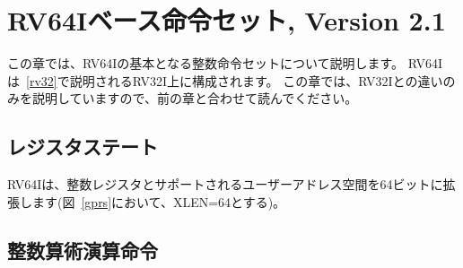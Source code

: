 \begin{comment}
\chapter{RV64I Base Integer Instruction Set, Version 2.1}
\end{comment}
\chapter{RV64Iベース命令セット, Version 2.1}
\label{rv64}

\begin{comment}
This chapter describes the RV64I base integer instruction set, which
builds upon the RV32I variant described in Chapter~\ref{rv32}.  This
chapter presents only the differences with RV32I, so should be read in
conjunction with the earlier chapter.
\end{comment}

この章では、RV64Iの基本となる整数命令セットについて説明します。
RV64Iは~\ref{rv32}で説明されるRV32I上に構成されます。
この章では、RV32Iとの違いのみを説明していますので、前の章と合わせて読んでください。

\begin{comment}
\section{Register State}
\end{comment}
\section{レジスタステート}

\begin{comment}
RV64I widens the integer registers and supported user address space to
64 bits (XLEN=64 in Figure~\ref{gprs}).
\end{comment}

RV64Iは、整数レジスタとサポートされるユーザーアドレス空間を64ビットに拡張します(図~\ref{gprs}において、XLEN=64とする)。

\begin{comment}
\section{Integer Computational Instructions}
\end{comment}
\section{整数算術演算命令}

